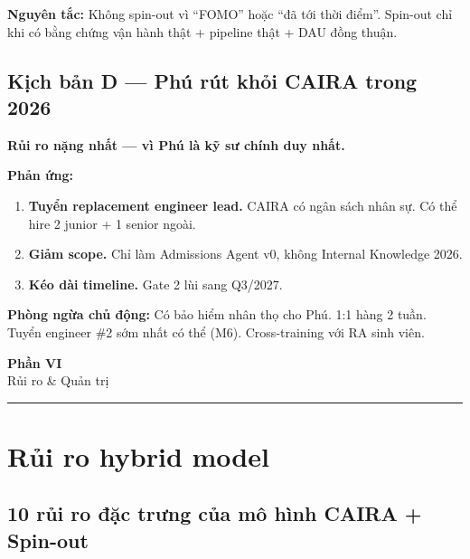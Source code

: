 \documentclass[11pt,a4paper]{article}
\begin{document}
\textbf{Nguyên tắc:} Không spin-out vì ``FOMO'' hoặc ``đã tới thời điểm''. Spin-out chỉ khi có bằng chứng vận hành thật + pipeline thật + DAU đồng thuận.

\subsection{Kịch bản D --- Phú rút khỏi CAIRA trong 2026}

\textbf{Rủi ro nặng nhất --- vì Phú là kỹ sư chính duy nhất.}

\textbf{Phản ứng:}

\begin{enumerate}
\item \textbf{Tuyển replacement engineer lead.} CAIRA có ngân sách nhân sự. Có thể hire 2 junior + 1 senior ngoài.
\item \textbf{Giảm scope.} Chỉ làm Admissions Agent v0, không Internal Knowledge 2026.
\item \textbf{Kéo dài timeline.} Gate 2 lùi sang Q3/2027.
\end{enumerate}

\textbf{Phòng ngừa chủ động:} Có bảo hiểm nhân thọ cho Phú. 1:1 hàng 2 tuần. Tuyển
engineer \#2 sớm nhất có thể (M6). Cross-training với RA sinh viên.

\clearpage

\begin{center}
\vspace*{0.5em}
{\sffamily\bfseries\Huge\color{ink} Phần VI}\\[0.5em]
{\sffamily\LARGE\color{mid} Rủi ro \& Quản trị}\\[0.5em]
{\color{ink}\rule{6cm}{0.4pt}}
\end{center}
\vspace{1em}

\section{Rủi ro hybrid model}

\subsection{10 rủi ro đặc trưng của mô hình CAIRA + Spin-out}
\end{document}
